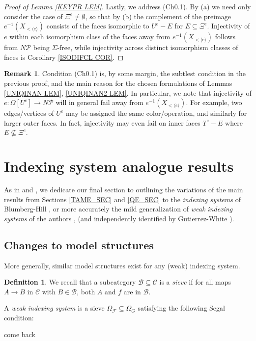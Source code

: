 \documentclass[a4paper,10pt
,draft
]{article}%
\numberwithin{equation}{section}
\numberwithin{figure}{section}
\theoremstyle{definition} %
\newtheorem{definition}[equation]{Definition}%
\newtheorem{remark}[equation]{Remark}%
\newcommand{\F}{\ensuremath{\mathcal F}}
\newcommand{\1}{\ensuremath{\mathbbm 1}}%
\begin{document}
\begin{proof}[Proof of Lemma \ref{KEYPR LEM}]
	
	Lastly, we address (Ch0.1). By (a) we need only consider the case of $\Xi^e \neq \emptyset$,
	so that by (b)
	the complement of
	the preimage
	$e^{-1}(X_{<\langle e\rangle})$
	consists of the faces isomorphic to
	$U^e-E$ for $E \subseteq \Xi^e$.
	Injectivity of $e$ within each isomorphism class of the faces away from %
	$e^{-1}(X_{<\langle e\rangle})$
	follows from $N \mathcal{P}$ being $\Sigma$-free,
	while injectivity across distinct isomorphism classes of faces is
	Corollary \ref{ISODIFCL COR}.
\end{proof}



\begin{remark}
	Condition (Ch0.1) is, by some margin, the subtlest condition in the previous proof, and the main reason for the chosen formulations of 
	Lemmas \ref{UNIQINAN LEM}, \ref{UNIQINAN2 LEM}.
	In particular, we note that injectivity of 
	$e \colon \Omega[U^e] \to N \mathcal{P}$ will in general fail away from 
	$e^{-1}(X_{< \langle e \rangle})$.
	For example, two edges/vertices of $U^e$
	may be assigned the same color/operation, and similarly for larger outer faces. In fact, injectivity may even fail on inner faces
	$T^e-E$ where $E \not \subseteq \Xi^e$.
\end{remark}














\section{Indexing system analogue results}\label{INDSYS SEC}

As in \cite[\S 6]{BP_edss} and \cite[\S 9]{Per18}, we dedicate our final section to 
outlining the variations of the main results from Sections \ref{TAME_SEC} and \ref{QE_SEC} to
the \textit{indexing systems} of Blumberg-Hill \cite{BH15}, or more accurately
the mild generalization of \textit{weak indexing systems} of the authors \cite[\S 9]{Per18}, \cite[\S4.4]{BP_geo} (and independently identified by Gutierrez-White \cite{GW18}).


\subsection{Changes to model structures}
More generally, similar model structures exist for any (weak) indexing system.
\begin{definition}
      We recall that a subcategory $\mathcal B \subseteq \mathcal C$ is a \textit{sieve} if for all maps $A \to B$ in $\mathcal C$
      with $B \in \mathcal B$, both $A$ and $f$ are in $\mathcal B$.

      A \textit{weak indexing system} is a sieve
      $\Omega_\F \subseteq \Omega_G$
      satisfying the following Segal condition:

      come back
\end{definition}
\end{document}
